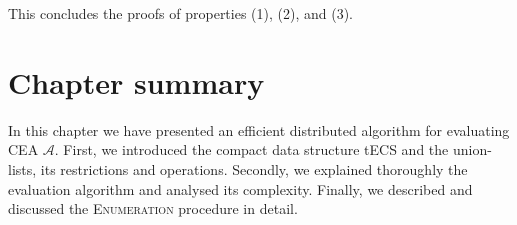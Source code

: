 This concludes the proofs of properties (1), (2), and (3).

\section{Chapter summary}

In this chapter we have presented an efficient distributed algorithm for evaluating CEA $\mathcal{A}$. First, we introduced the compact data structure tECS and the union-lists, its restrictions and operations. Secondly, we explained thoroughly the evaluation algorithm and analysed its complexity. Finally, we described and discussed the \textsc{Enumeration} procedure in detail.
